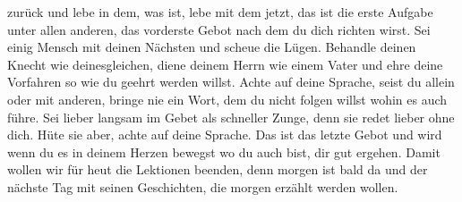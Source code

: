 \documentclass[
]{article}
\begin{document}
zurück und lebe in dem, was ist, lebe mit dem jetzt, das ist die erste
Aufgabe unter allen anderen, das vorderste Gebot nach dem du dich
richten wirst. Sei einig Mensch mit deinen Nächsten und scheue die
Lügen. Behandle deinen Knecht wie deinesgleichen, diene deinem Herrn wie
einem Vater und ehre deine Vorfahren so wie du geehrt werden willst.
Achte auf deine Sprache, seist du allein oder mit anderen, bringe nie
ein Wort, dem du nicht folgen willst wohin es auch führe. Sei lieber
langsam im Gebet als schneller Zunge, denn sie redet lieber ohne dich.
Hüte sie aber, achte auf deine Sprache. Das ist das letzte Gebot und
wird wenn du es in deinem Herzen bewegst wo du auch bist, dir gut
ergehen. Damit wollen wir für heut die Lektionen beenden, denn morgen
ist bald da und der nächste Tag mit seinen Geschichten, die morgen
erzählt werden wollen.
\end{document}
